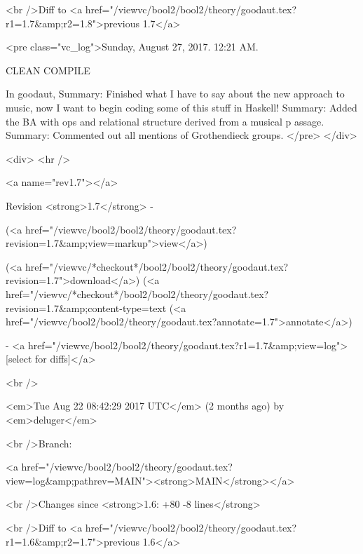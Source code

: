 <br />Diff to <a href="/viewvc/bool2/bool2/theory/goodaut.tex?r1=1.7&amp;r2=1.8">previous 1.7</a>










<pre class="vc_log">Sunday, August 27, 2017.  12:21 AM.

CLEAN COMPILE

In goodaut,
Summary: Finished what I have to say about the new approach to music,
now I want to begin coding some of this stuff in Haskell!
Summary: Added the BA with ops and relational structure derived from a musical p
assage.
Summary: Commented out all mentions of Grothendieck groups.
</pre>
</div>



<div>
<hr />

<a name="rev1.7"></a>


Revision <strong>1.7</strong> -


(<a href="/viewvc/bool2/bool2/theory/goodaut.tex?revision=1.7&amp;view=markup">view</a>)


(<a href="/viewvc/*checkout*/bool2/bool2/theory/goodaut.tex?revision=1.7">download</a>)
(<a href="/viewvc/*checkout*/bool2/bool2/theory/goodaut.tex?revision=1.7&amp;content-type=text%
(<a href="/viewvc/bool2/bool2/theory/goodaut.tex?annotate=1.7">annotate</a>)



- <a href="/viewvc/bool2/bool2/theory/goodaut.tex?r1=1.7&amp;view=log">[select for diffs]</a>




<br />

<em>Tue Aug 22 08:42:29 2017 UTC</em>
(2 months ago)
by <em>deluger</em>


<br />Branch:

<a href="/viewvc/bool2/bool2/theory/goodaut.tex?view=log&amp;pathrev=MAIN"><strong>MAIN</strong></a>







<br />Changes since <strong>1.6: +80 -8 lines</strong>








<br />Diff to <a href="/viewvc/bool2/bool2/theory/goodaut.tex?r1=1.6&amp;r2=1.7">previous 1.6</a>










